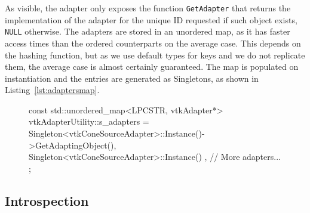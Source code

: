 As visible, the adapter only exposes the function \verb|GetAdapter| that returns the implementation of the adapter for the unique ID requested if such object exists, \verb|NULL| otherwise. The adapters are stored in an unordered map, as it has faster access times than the ordered counterparts \cite{stdunord16, stdmapcp55} on the average case. This depends on the hashing function, but as we use default types for keys and we do not replicate them, the average case is almost certainly guaranteed. The map is populated on instantiation and the entries are generated as Singletons, as shown in Listing~\ref{lst:adaptersmap}.

\begin{figure}[ht!]
    \centering
    \begin{cpp}[label=lst:adaptersmap,caption={Example of adapters register instantiation.}]
const std::unordered_map<LPCSTR, vtkAdapter*> vtkAdapterUtility::s_adapters =
{
	{ Singleton<vtkConeSourceAdapter>::Instance()->GetAdaptingObject(), Singleton<vtkConeSourceAdapter>::Instance() },
	// More adapters...
};
    \end{cpp}
\end{figure}

\subsection{Introspection}
\label{sec:design-introspection}




